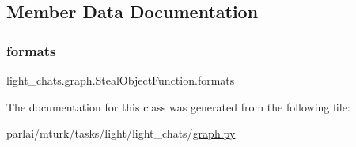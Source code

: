 \subsection{Member Data Documentation}
\mbox{\label{classlight__chats_1_1graph_1_1StealObjectFunction_a07d054e11c32eecd7c93102de254ffec}} 
\subsubsection{\texorpdfstring{formats}{formats}}
{\footnotesize\ttfamily light\+\_\+chats.\+graph.\+Steal\+Object\+Function.\+formats}



The documentation for this class was generated from the following file\+:\begin{DoxyCompactItemize}
\item 
parlai/mturk/tasks/light/light\+\_\+chats/\hyperlink{parlai_2mturk_2tasks_2light_2light__chats_2graph_8py}{graph.\+py}\end{DoxyCompactItemize}

